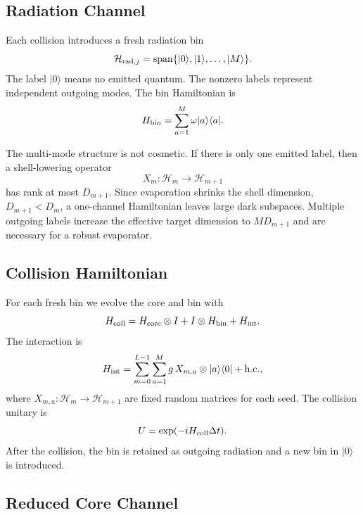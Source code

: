 \subsection{Radiation Channel}

Each collision introduces a fresh radiation bin
\begin{equation}
  \mathcal{H}_{{\rm rad},j}
  =
  {\rm span}\{|0\rangle, |1\rangle,\ldots,|M\rangle\}.
\end{equation}
The label $|0\rangle$ means no emitted quantum. The nonzero labels represent independent outgoing modes. The bin Hamiltonian is
\begin{equation}
  H_{\rm bin}=\sum_{a=1}^{M}\omega |a\rangle\langle a|.
\end{equation}

The multi-mode structure is not cosmetic. If there is only one emitted label, then a shell-lowering operator
\begin{equation}
  X_m:\mathcal{H}_m\rightarrow \mathcal{H}_{m+1}
\end{equation}
has rank at most $D_{m+1}$. Since evaporation shrinks the shell dimension, $D_{m+1}<D_m$, a one-channel Hamiltonian leaves large dark subspaces. Multiple outgoing labels increase the effective target dimension to $M D_{m+1}$ and are necessary for a robust evaporator.

\subsection{Collision Hamiltonian}

For each fresh bin we evolve the core and bin with
\begin{equation}
  H_{\rm coll}=H_{\rm core}\otimes I
  +I\otimes H_{\rm bin}
  +H_{\rm int}.
\end{equation}
The interaction is
\begin{equation}
  H_{\rm int}
  =
  \sum_{m=0}^{L-1}\sum_{a=1}^{M}
  g\, X_{m,a}\otimes |a\rangle\langle 0|
  +{\rm h.c.},
\end{equation}
where $X_{m,a}:\mathcal{H}_m\rightarrow \mathcal{H}_{m+1}$ are fixed random matrices for each seed. The collision unitary is
\begin{equation}
  U=\exp(-i H_{\rm coll}\Delta t).
\end{equation}
After the collision, the bin is retained as outgoing radiation and a new bin in $|0\rangle$ is introduced.

\subsection{Reduced Core Channel}

